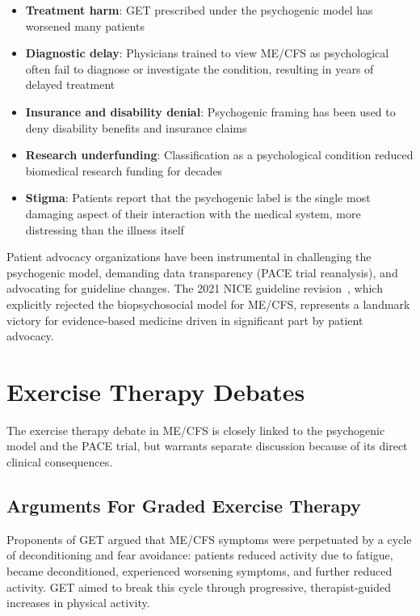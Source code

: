 \begin{itemize}
    \item \textbf{Treatment harm}: GET prescribed under the psychogenic model has worsened many patients~\cite{Kindlon2011GET}
    \item \textbf{Diagnostic delay}: Physicians trained to view ME/CFS as psychological often fail to diagnose or investigate the condition, resulting in years of delayed treatment
    \item \textbf{Insurance and disability denial}: Psychogenic framing has been used to deny disability benefits and insurance claims
    \item \textbf{Research underfunding}: Classification as a psychological condition reduced biomedical research funding for decades
    \item \textbf{Stigma}: Patients report that the psychogenic label is the single most damaging aspect of their interaction with the medical system, more distressing than the illness itself
\end{itemize}

Patient advocacy organizations have been instrumental in challenging the psychogenic model, demanding data transparency (PACE trial reanalysis), and advocating for guideline changes. The 2021 NICE guideline revision~\cite{NICE2021mecfs}, which explicitly rejected the biopsychosocial model for ME/CFS, represents a landmark victory for evidence-based medicine driven in significant part by patient advocacy.

\section{Exercise Therapy Debates}
\label{sec:exercise-debates}

The exercise therapy debate in ME/CFS is closely linked to the psychogenic model and the PACE trial, but warrants separate discussion because of its direct clinical consequences.

\subsection{Arguments For Graded Exercise Therapy}

Proponents of GET argued that ME/CFS symptoms were perpetuated by a cycle of deconditioning and fear avoidance: patients reduced activity due to fatigue, became deconditioned, experienced worsening symptoms, and further reduced activity. GET aimed to break this cycle through progressive, therapist-guided increases in physical activity.

